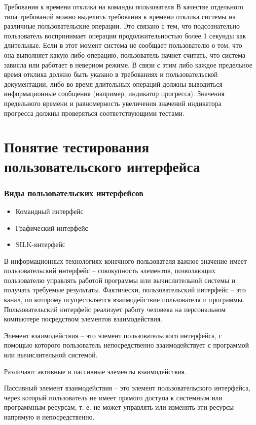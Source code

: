 \documentclass{../industrial-development}
\begin{document}
\lecturenotes

Требования к времени отклика на команды пользователя
В качестве отдельного типа требований можно выделить требования к времени отклика системы на различные пользовательские операции. Это связано с тем, что подсознательно пользователь воспринимает операции продолжительностью более 1 секунды как длительные. Если в этот момент система не сообщает пользователю о том, что она выполняет какую-либо операцию, пользователь начнет считать, что система зависла или работает в неверном режиме. В связи с этим либо каждое предельное время отклика должно быть указано в требованиях и пользовательской документации, либо во время длительных операций должны выводиться информационные сообщения (например, индикатор прогресса). Значения предельного времени и равномерность увеличения значений индикатора прогресса должны проверяться соответствующими тестами.

\section{Понятие тестирования пользовательского интерфейса}

\begin{frame} \frametitle{Виды пользовательских интерфейсов}
  \begin{itemize}
  \item Командный интерфейс
  \item Графический интерфейс
  \item SILK-интерфейс
  \end{itemize}
\end{frame}

\lecturenotes

В информационных технологиях конечного пользователя важное значение имеет пользовательский интерфейс – совокупность элементов, позволяющих пользователю управлять работой программы или вычислительной системы и получать требуемые результаты. Фактически, пользовательский интерфейс – это канал, по которому осуществляется взаимодействие пользователя и программы. Пользовательский интерфейс реализует работу человека на персональном компьютере посредством элементов взаимодействия.

Элемент взаимодействия – это элемент пользовательского интерфейса, с помощью которого пользователь непосредственно взаимодействует с программой или вычислительной системой.

Различают активные и пассивные элементы взаимодействия.

Пассивный элемент взаимодействия – это элемент пользовательского интерфейса, через который пользователь не имеет прямого доступа к системным или программным ресурсам, т. е. не может управлять или изменять эти ресурсы напрямую и непосредственно.
\end{document}
